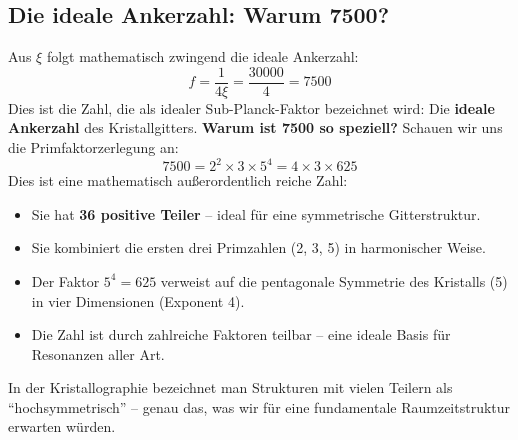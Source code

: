 	\subsection{Die ideale Ankerzahl: Warum 7500?}
	Aus \(\xi\) folgt mathematisch zwingend die ideale Ankerzahl:
	\begin{equation}
		\boxed{f = \frac{1}{4\xi} = \frac{30000}{4} = 7500}
	\end{equation}
	Dies ist die Zahl, die als idealer Sub-Planck-Faktor bezeichnet wird: Die \textbf{ideale Ankerzahl} des Kristallgitters.
	\textbf{Warum ist 7500 so speziell?} Schauen wir uns die Primfaktorzerlegung an:
	\begin{equation}
		7500 = 2^2 \times 3 \times 5^4 = 4 \times 3 \times 625
	\end{equation}
	Dies ist eine mathematisch außerordentlich reiche Zahl:
	\begin{itemize}
		\item Sie hat \textbf{36 positive Teiler} -- ideal für eine symmetrische Gitterstruktur.
		\item Sie kombiniert die ersten drei Primzahlen (2, 3, 5) in harmonischer Weise.
		\item Der Faktor \(5^4 = 625\) verweist auf die pentagonale Symmetrie des Kristalls (5) in vier Dimensionen (Exponent 4).
		\item Die Zahl ist durch zahlreiche Faktoren teilbar -- eine ideale Basis für Resonanzen aller Art.
	\end{itemize}
	In der Kristallographie bezeichnet man Strukturen mit vielen Teilern als \enquote{hochsymmetrisch} -- genau das, was wir für eine fundamentale Raumzeitstruktur erwarten würden.
